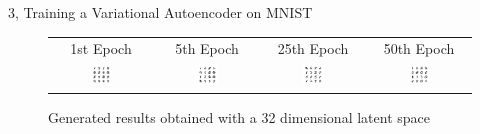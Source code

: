 \documentclass[10pt,a4paper]{article}
\begin{document}
\begin{task}{3, Training a Variational Autoencoder on MNIST}
\begin{enumerate}
\begin{figure}[H]
\caption{Generated results obtained with a 32 dimensional latent space}
\label{fig:latent-32} 
\begin{tabular}{cccc}
	1st Epoch & 5th Epoch & 25th Epoch & 50th Epoch \\
	\includegraphics[width=0.23\textwidth]{../plots/task3/generated_epochs1_latent32.png} &   \includegraphics[width=0.23\textwidth]{../plots/task3/generated_epochs5_latent32.png} & \includegraphics[width=0.23\textwidth]{../plots/task3/generated_epochs25_latent32.png} &   \includegraphics[width=0.23\textwidth]{../plots/task3/generated_epochs50_latent32.png} \\
\end{tabular}
\end{figure}


\end{enumerate}
\end{task}
\end{document}
